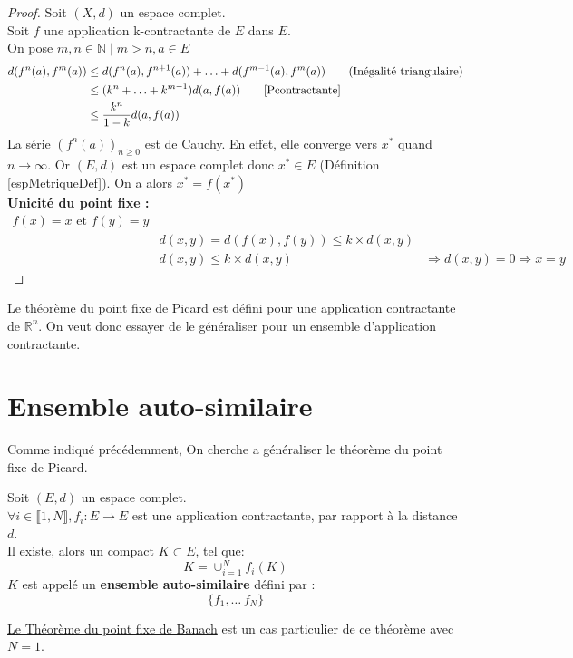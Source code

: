 \documentclass[a4paper, 12pt]{report}
\begin{document}
			\begin{proof}
				Soit $(X,d)$ un espace complet.\\
				Soit $f$ une application k-contractante de $E$ dans $E$.\\
				On pose $m,n\in\mathds{N}\mid m>n,a\in E$\\
				\begin{align*}
					d(f^n(a),f^m(a))&\leq d(f^n(a),f^{n+1}(a))+\ldots+d(f^{m-1}(a),f^m(a))  \tag{Inégalité triangulaire}\\
									&\leq (k^n+\ldots+k^{m-1})d(a,f(a)) \tag*{\eqref{Pcontractante}}\\
									&\leq \frac{k^n}{1-k}d(a,f(a))
				\end{align*}
				La série $(f^n(a))_{n\geq 0}$ est de Cauchy. En effet, elle converge vers $x^*$ quand $n\longrightarrow\infty$.
				Or $(E,d)$ est un espace complet donc $x^*\in E$ (Définition \ref{espMetriqueDef}).
				On a alors $x^*=f(x^*)$\\
				\textbf{Unicité du point fixe :}
				\begin{align*}
					f(x)=x \textrm{ et } f(y)=y\\
					&d(x,y) = d(f(x),f(y)) \leq k\times d(x,y)\\
					&d(x,y) \leq k\times d(x,y)
					&\Rightarrow d(x,y)=0\Rightarrow x=y \tag{Unicité}
				\end{align*}
			\end{proof}
			\hspace{.7 cm} Le théorème du point fixe de Picard est défini pour une application contractante de $\mathds{R}^n$. On veut donc essayer de le généraliser pour un ensemble d'application contractante.
\newpage
		\section{Ensemble auto-similaire}
			Comme indiqué précédemment, On cherche a généraliser le théorème du point fixe de Picard.
			\begin{theorem}
			\label{thmPrincipale}
				Soit $(E,d)$ un espace complet.\\
				$\forall i \in \llbracket 1,N \rrbracket, f_i:E \longrightarrow E$ est une application contractante, par rapport à la distance $d$.\\
				Il existe, alors un compact $K\subset E$, tel que:
				\begin{equation*}
					K=\cup^N_{i=1}f_i(K)
				\end{equation*}
				$K$ est appelé un \textbf{ensemble auto-similaire} défini par :
				\begin{equation*}
					\{f_1,\ldots\,f_N\}
				\end{equation*}
			\end{theorem}
			\begin{remark*}
			\hyperref[ThmPtFixe]{Le Théorème du point fixe de Banach} est un cas particulier de ce théorème avec $N=1$.
			\end{remark*}
		
\end{document}
